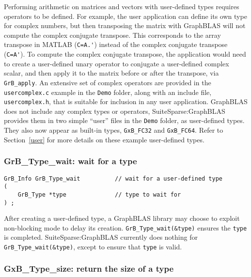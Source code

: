 \documentclass[12pt]{article}
\begin{document}
Performing arithmetic on matrices and vectors with user-defined types requires
operators to be defined.  For example, the user application can define its own
type for complex numbers, but then transposing the matrix with GraphBLAS will
not compute the complex conjugate transpose.  This corresponds to the array
transpose in MATLAB (\verb"C=A.'") instead of the complex conjugate transpose
(\verb"C=A'").  To compute the complex conjugate transpose, the application
would need to create a user-defined unary operator to conjugate a user-defined
complex scalar, and then apply it to the matrix before or after the transpose,
via \verb'GrB_apply'.  An extensive set of complex operators are provided in
the \verb'usercomplex.c' example in the \verb'Demo' folder, along with an
include file, \verb'usercomplex.h', that is suitable for inclusion in any user
application.  GraphBLAS does not include any complex types or operators,
SuiteSparse:GraphBLAS provides them in two simple ``user'' files in the
\verb'Demo' folder, as user-defined types.  They also now appear as built-in
types, \verb'GxB_FC32' and \verb'GxB_FC64'.  Refer to Section~\ref{user} for
more details on these example user-defined types.

\subsubsection{{\sf GrB\_Type\_wait:} wait for a type}

\begin{mdframed}[userdefinedwidth=6in]
{\footnotesize
\begin{verbatim}
GrB_Info GrB_Type_wait          // wait for a user-defined type
(
    GrB_Type *type              // type to wait for
) ;
\end{verbatim}
}\end{mdframed}

After creating a user-defined type, a GraphBLAS library may choose to exploit
non-blocking mode to delay its creation.  \verb'GrB_Type_wait(&type)' ensures
the \verb'type' is completed.  SuiteSparse:GraphBLAS currently does nothing for
\verb'GrB_Type_wait(&type)', except to ensure that \verb'type' is valid.

\newpage
\subsubsection{{\sf GxB\_Type\_size:} return the size of a type}
\end{document}
